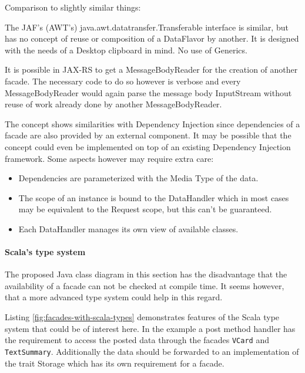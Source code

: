 \documentclass[12pt,a4paper]{scrartcl}		%
\begin{document}


Comparison to slightly similar things:

The JAF's (AWT's) java.awt.datatransfer.Transferable interface is similar, but
has no concept of reuse or composition of a DataFlavor by another. It is
designed with the needs of a Desktop clipboard in mind. No use of Generics.

It is possible in JAX-RS to get a MessageBodyReader for the creation of another
facade. The necessary code to do so however is verbose and every
MessageBodyReader would again parse the message body InputStream without reuse
of work already done by another MessageBodyReader.

The concept shows similarities with Dependency Injection since dependencies of a
facade are also provided by an external component. It may be possible that the
concept could even be implemented on top of an existing Dependency Injection
framework. Some aspects however may require extra care:

\begin{itemize}
\item Dependencies are parameterized with the Media Type of the data.
\item The scope of an instance is bound to the DataHandler which in most cases may be equivalent to the Request scope, but this can't be guaranteed.
\item Each DataHandler manages its own view of available classes.
\end{itemize}

\paragraph{Scala's type system}
The proposed Java class diagram in this section has the disadvantage that the
availability of a facade can not be checked at compile time. It seems however,
that a more advanced type system could help in this regard.

Listing \ref{fig:facades-with-scala-types} demonstrates features of the Scala
type system\cite{Odersky2011} that could be of interest here. In the example a
post method handler has the requirement to access the posted data through the
facades \lstinline:VCard: and \lstinline:TextSummary:. Additionally the data
should be forwarded to an implementation of the trait Storage which has its own
requirement for a facade.
\end{document}
